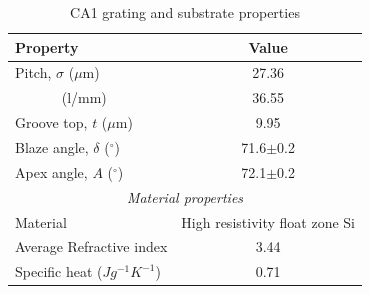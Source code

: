 \begin{table}[h]
\caption {CA1 grating and substrate properties} \label{tab:title} 
\begin{center}
\begin{tabular}{lc}
\hline
Property & Value \\
\hline
Pitch, $\sigma$ ($\mu$m)  & 27.36 \\
$\;\;\;\;\;\;\;\;\;\;\;\;$(l/mm) & 36.55\\
Groove top, $t$ ($\mu$m)  & 9.95 \\
Blaze angle, $\delta$ ($^\circ$)  & 71.6$\pm$0.2 \\
Apex angle, $A$ ($^\circ$) & 72.1$\pm$0.2 \\
\multicolumn{2}{c}{\emph{Material properties}} \\
Material & High resistivity float zone Si \\
Average Refractive index & 3.44 \\
Specific heat ($J g^{-1} K^{-1}$) & 0.71 \\ 
\hline
\end{tabular}
\end{center}
\end{table}


